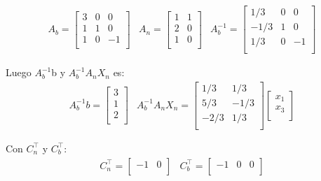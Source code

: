 \documentclass{article}
\begin{document}
\begin{flushleft}
		\begin{equation*}
			\begin{array}{ccc}
				A_b = \begin{bmatrix}
					3 & 0 & 0 \\
					1 & 1 & 0\\
					1 & 0 & -1 \\
				\end{bmatrix} &
				A_n = \begin{bmatrix}
					1 & 1\\
					2 & 0\\
					1 & 0 \\
				\end{bmatrix} &
				A_b^{-1} = \begin{bmatrix}
					1/3 & 0  & 0 \\
					-1/3 & 1  & 0 \\
					1/3 & 0  & -1 \\
				\end{bmatrix}
			\end{array}
		\end{equation*}

		Luego $A_b^{-1}$b y $A_b^{-1}$$A_n$$X_n$ es:
		\begin{equation*}
			\begin{array}{cc}
				A_b^{-1}b = \begin{bmatrix}
					3  \\
					1 \\
					2 \\
				\end{bmatrix} &
				A_b^{-1}A_nX_n = \begin{bmatrix}
					1/3 & 1/3  \\
					5/3 & -1/3 \\
					-2/3 & 1/3 \\
				\end{bmatrix}
				\begin{bmatrix}
					x_1 \\
					x_3 \\
				\end{bmatrix}
			\end{array}
		\end{equation*}

		Con $C_n^\intercal$ y $C_b^\intercal$:
		\begin{equation*}
			\begin{array}{cc}
				C_n^\intercal = \begin{bmatrix}
					-1 & 0 \\
				\end{bmatrix} &
				C_b^\intercal = \begin{bmatrix}
					-1 & 0 & 0 \\
				\end{bmatrix}
			\end{array}
		\end{equation*}


\end{flushleft}
\end{document}
